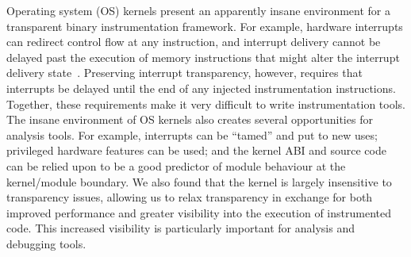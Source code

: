 \documentclass[preprint]{sigplanconf}
\begin{document}

Operating system (OS) kernels present an apparently insane environment for a transparent binary instrumentation framework.  For example, hardware interrupts can redirect control flow at any instruction, and interrupt delivery cannot be delayed past the execution of memory instructions that might alter the interrupt delivery state~\cite{DRK}. Preserving interrupt transparency, however, requires that interrupts be delayed until the end of any injected instrumentation instructions.  Together, these requirements make it very difficult to write instrumentation tools.  The insane environment of OS kernels also creates several opportunities for analysis tools. For example, interrupts can be ``tamed'' and put to new uses; privileged hardware features can be used; and the kernel ABI and source code can be relied upon to be a good predictor of module behaviour at the kernel/module boundary. We also found that the kernel is largely insensitive to transparency issues, allowing us to relax transparency in exchange for both improved performance and greater visibility into the execution of instrumented code.  This increased visibility is particularly important for analysis and debugging tools.
\end{document}
